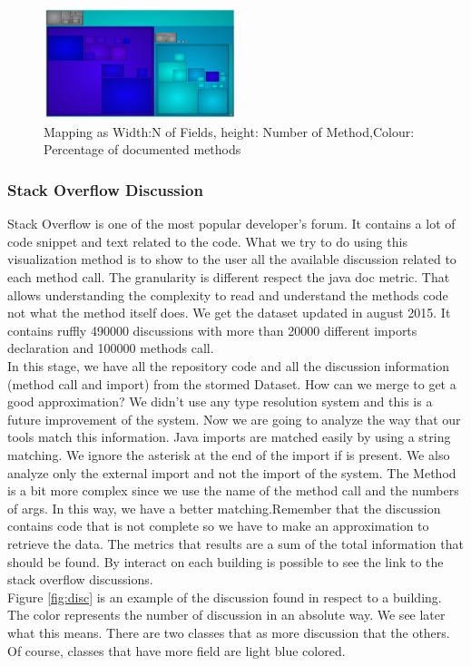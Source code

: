 \documentclass[]{usiinfbachelorproject}
\begin{document}
\begin{figure}[H]
	\centering
	\includegraphics[width=0.5\textwidth]{images/javaDocOnlyPackage}
	
	\caption[Java Documentation Mapping Only Package]{Mapping as Width:N of Fields, height: Number of Method,Colour: Percentage of documented methods\label{fig:OnlyPackage}}
\end{figure}


\subsubsection{Stack Overflow  Discussion}
Stack Overflow is one of the most popular developer's forum. It contains a lot of code snippet and text related to the code. What we try to do using this visualization method is to show to the user all the available discussion related to each method call. The granularity is different respect the java doc metric. That allows understanding the complexity to read and understand the methods code not what the method itself does. We get the dataset updated in august 2015. It contains ruffly 490000 discussions with more than 20000 different imports declaration and 100000 methods call.\\
In this stage, we have all the repository code and all the discussion information (method call and import) from the stormed Dataset. How can we merge to get a good approximation? We didn't use any type resolution system and this is a future improvement of the system. Now we are going to analyze the way that our tools match this information. Java imports are matched easily by using a string matching. We ignore the asterisk at the end of the import if is present. We also analyze only the external import and not the import of the system.
The Method is a bit more complex since we use the name of the method call and the numbers of args. In this way, we have a better matching.Remember that the discussion contains code that is not complete so we have to make an approximation to retrieve the data. The metrics that results are a sum of the total information that should be found. By interact on each building is possible to see the link to the stack overflow discussions.\\
Figure \ref{fig:disc} is an example of the discussion found in respect to a building. The color represents the number of discussion in an absolute way. We see later what this means. There are two classes that as more discussion that the others. Of course, classes that have more field are light blue colored.
\end{document}
